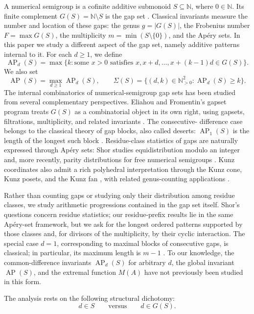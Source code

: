 \documentclass[11pt]{article}
\theoremstyle{plain}
\theoremstyle{definition}
\theoremstyle{remark}
\newcommand{\N}{\mathbb N}
\newcommand{\AP}{\operatorname{AP}}
\begin{document}
A numerical semigroup is a cofinite additive submonoid $S\subseteq\N$, where
$0\in\N$.  Its finite complement $G(S)=\N\setminus S$ is the gap set
\cite{rosales-garcia-sanchez}.
Classical invariants measure the number and location of these gaps: the
genus $g=|G(S)|$, the Frobenius number $F=\max G(S)$, the multiplicity
$m=\min(S\setminus\{0\})$, and the Ap\'ery sets.  In this paper we study a
different aspect of the gap set, namely additive patterns internal to it.
For each $d\geq1$, we define
\[
  \AP_d(S)=\max\{k:\text{some }x>0\text{ satisfies }
  x,x+d,\ldots,x+(k-1)d\in G(S)\}.
\]
We also set
\[
  \AP(S)=\max_{d\geq1}\AP_d(S),
  \qquad
  \Sigma(S)=\{(d,k)\in\N_{>0}^2:\AP_d(S)\geq k\}.
\]
The internal combinatorics of numerical-semigroup gap sets has been studied
from several complementary perspectives.  Eliahou and Fromentin's gapset
program treats $G(S)$ as a combinatorial object in its own right, using
gapsets, filtrations, multiplicity, and related invariants
\cite{eliahou-fromentin-gapsets,eliahou-fromentin-small}.  The consecutive-
difference case belongs to the classical theory of gap blocks, also called
deserts: $\AP_1(S)$ is the length of the longest such block
\cite{moree-gap-blocks}.  Residue-class statistics of gaps are naturally
expressed through Ap\'ery sets: Shor
studies equidistribution modulo an integer and, more recently, parity
distributions for free numerical semigroups
\cite{shor-equidistribution,shor-parity}.  Kunz coordinates also admit a rich
polyhedral interpretation through the Kunz cone, Kunz posets, and the Kunz
fan \cite{kaplan-oneill-group-cone,brower-mcdonough-oneill-kunz-fan}, with
related genus-counting applications \cite{bernardini-kunz}.

Rather than counting gaps or studying only their distribution among residue
classes, we study arithmetic progressions contained in the gap set itself.
Shor's questions concern residue statistics; our residue-prefix results lie
in the same Ap\'ery-set framework, but we ask for the longest ordered
patterns supported by those classes and, for divisors of the multiplicity,
by their cyclic interaction.  The special case $d=1$, corresponding to
maximal blocks of consecutive gaps, is classical; in particular, its maximum
length is $m-1$ \cite{moree-gap-blocks}.  To our knowledge, the
common-difference invariants $\AP_d(S)$ for arbitrary $d$, the global
invariant $\AP(S)$, and the extremal function $M(A)$ have not previously
been studied in this form.

The analysis rests on the following structural dichotomy:
\[
  d\in S
  \qquad\text{versus}\qquad
  d\in G(S).
\]
\end{document}
